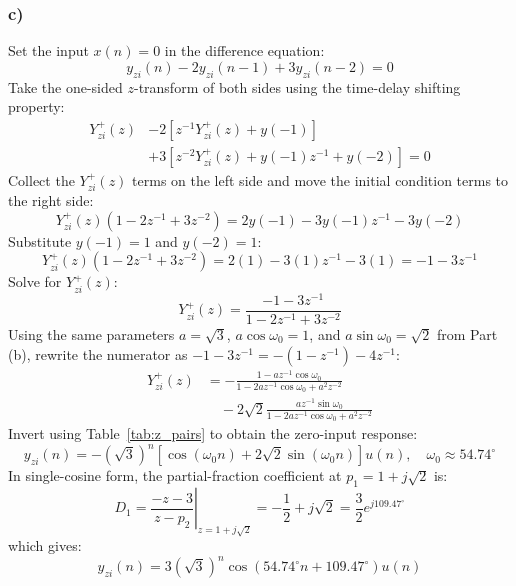 \documentclass[12pt,a4paper]{article}
\begin{document}
\subsubsection*{c)}
Set the input $x(n) = 0$ in the difference equation:
\[
y_{zi}(n) - 2y_{zi}(n-1) + 3y_{zi}(n-2) = 0
\]
Take the one-sided $z$-transform of both sides using the time-delay shifting property:
\[
\begin{aligned}
Y_{zi}^+(z) &- 2\left[z^{-1}Y_{zi}^+(z) + y(-1)\right] \\
&+ 3\left[z^{-2}Y_{zi}^+(z) + y(-1)z^{-1} + y(-2)\right] = 0
\end{aligned}
\]
Collect the $Y_{zi}^+(z)$ terms on the left side and move the initial condition terms to the right side:
\[
Y_{zi}^+(z)(1 - 2z^{-1} + 3z^{-2}) = 2y(-1) - 3y(-1)z^{-1} - 3y(-2)
\]
Substitute $y(-1) = 1$ and $y(-2) = 1$:
\[
Y_{zi}^+(z)(1 - 2z^{-1} + 3z^{-2}) = 2(1) - 3(1)z^{-1} - 3(1) = -1 - 3z^{-1}
\]
Solve for $Y_{zi}^+(z)$:
\[
Y_{zi}^+(z) = \frac{-1 - 3z^{-1}}{1 - 2z^{-1} + 3z^{-2}}
\]
Using the same parameters $a = \sqrt{3}$, $a\cos\omega_0 = 1$, and $a\sin\omega_0 = \sqrt{2}$ from Part (b), rewrite the numerator as $-1 - 3z^{-1} = -(1 - z^{-1}) - 4z^{-1}$:
\[
\begin{aligned}
Y_{zi}^+(z) &= -\frac{1 - az^{-1}\cos\omega_0}{1 - 2az^{-1}\cos\omega_0 + a^2 z^{-2}} \\
&\quad - 2\sqrt{2}\frac{az^{-1}\sin\omega_0}{1 - 2az^{-1}\cos\omega_0 + a^2 z^{-2}}
\end{aligned}
\]
Invert using Table~\ref{tab:z_pairs} to obtain the zero-input response:
\[
y_{zi}(n) = -(\sqrt{3})^n \left[\cos(\omega_0 n) + 2\sqrt{2}\sin(\omega_0 n)\right]u(n), \quad \omega_0 \approx 54.74^\circ
\]
In single-cosine form, the partial-fraction coefficient at $p_1 = 1 + j\sqrt{2}$ is:
\[
D_1 = \left. \frac{-z - 3}{z - p_2} \right|_{z = 1 + j\sqrt{2}} = -\frac{1}{2} + j\sqrt{2} = \frac{3}{2}e^{j109.47^\circ}
\]
which gives:
\[
y_{zi}(n) = 3(\sqrt{3})^n \cos(54.74^\circ n + 109.47^\circ)u(n)
\]
\end{document}
